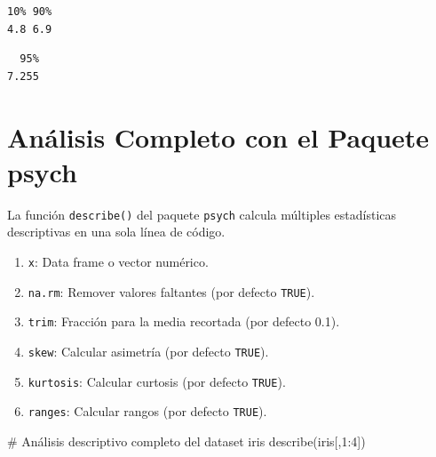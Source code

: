 \documentclass[
  spanish,
  letterpaper,
]{book}
\newenvironment{Shaded}{\begin{snugshade}}{\end{snugshade}}
\newcommand{\CommentTok}[1]{\textcolor[rgb]{0.37,0.37,0.37}{#1}}
\newcommand{\DecValTok}[1]{\textcolor[rgb]{0.68,0.00,0.00}{#1}}
\newcommand{\FloatTok}[1]{\textcolor[rgb]{0.68,0.00,0.00}{#1}}
\newcommand{\FunctionTok}[1]{\textcolor[rgb]{0.28,0.35,0.67}{#1}}
\newcommand{\NormalTok}[1]{\textcolor[rgb]{0.00,0.23,0.31}{#1}}
\newcommand{\SpecialCharTok}[1]{\textcolor[rgb]{0.37,0.37,0.37}{#1}}
\begin{document}
\begin{Shaded}
\end{Shaded}

\begin{verbatim}
10% 90% 
4.8 6.9 
\end{verbatim}

\begin{Shaded}
\end{Shaded}

\begin{verbatim}
  95% 
7.255 
\end{verbatim}

\section{Análisis Completo con el Paquete
psych}\label{anuxe1lisis-completo-con-el-paquete-psych}

La función \texttt{describe()} del paquete \texttt{psych} calcula
múltiples estadísticas descriptivas en una sola línea de código.

\begin{enumerate}
\def\labelenumi{\arabic{enumi}.}
\item
  \texttt{x}: Data frame o vector numérico.
\item
  \texttt{na.rm}: Remover valores faltantes (por defecto \texttt{TRUE}).
\item
  \texttt{trim}: Fracción para la media recortada (por defecto 0.1).
\item
  \texttt{skew}: Calcular asimetría (por defecto \texttt{TRUE}).
\item
  \texttt{kurtosis}: Calcular curtosis (por defecto \texttt{TRUE}).
\item
  \texttt{ranges}: Calcular rangos (por defecto \texttt{TRUE}).
\end{enumerate}

\begin{Shaded}
\begin{Highlighting}[]
\CommentTok{\# Análisis descriptivo completo del dataset iris}
\FunctionTok{describe}\NormalTok{(iris[,}\DecValTok{1}\SpecialCharTok{:}\DecValTok{4}\NormalTok{])}
\end{Highlighting}
\end{Shaded}
\end{document}

